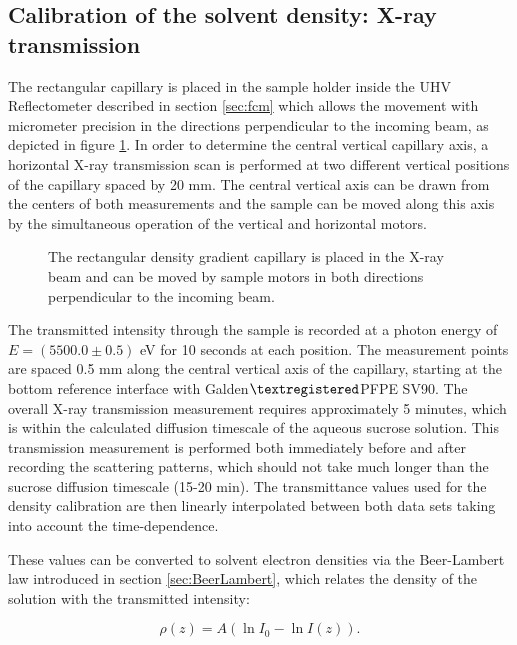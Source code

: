 \subsection{Calibration of the solvent density: X-ray transmission}
\label{sec:SolventCalibration}
The rectangular capillary is placed in the sample holder inside the UHV Reflectometer described in section \ref{sec:fcm} which allows the movement with micrometer precision in the directions perpendicular to the incoming beam, as depicted in figure \ref{fig:DensityGradientCapillarySetup}. In order to determine the central vertical capillary axis, a horizontal X-ray transmission scan is performed at two different vertical positions of the capillary spaced by 20 mm. The central vertical axis can be drawn from the centers of both measurements and the sample can be moved along this axis by the simultaneous operation of the vertical and horizontal motors.

\begin{figure}%
	\centering
		
		\caption{The rectangular density gradient capillary is placed in the X-ray beam and can be moved by sample motors in both directions perpendicular to the incoming beam.}
		\label{fig:DensityGradientCapillarySetup}
\end{figure}

The transmitted intensity through the sample is recorded at a photon energy of \(E = (5500.0 \pm  0.5)\) eV for 10 seconds at each position. The measurement points are spaced 0.5 mm along the central vertical axis of the capillary, starting at the bottom reference interface with Galden\(\textregistered\)PFPE SV90. The overall X-ray transmission measurement requires approximately 5 minutes, which is within the calculated diffusion timescale of the aqueous sucrose solution. This transmission measurement is performed both immediately before and after recording the scattering patterns, which should not take much longer than the sucrose diffusion timescale (15-20 min). The transmittance values used for the density calibration are then linearly interpolated between both data sets taking into account the time-dependence. 

These values can be converted to solvent electron densities via the Beer-Lambert law introduced in section \ref{sec:BeerLambert}, which relates the density of the solution with the transmitted intensity:

\begin{equation}
  \rho(z) = A \left( \ln{I_0} - \ln{I(z)} \right) .
\end{equation}

